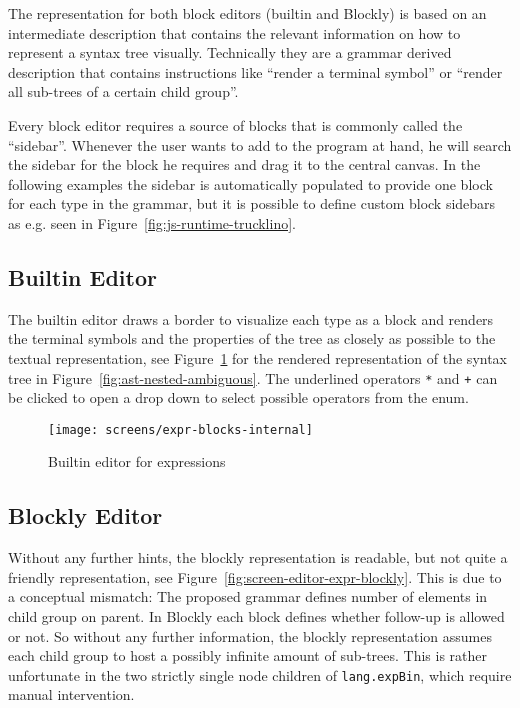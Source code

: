 \documentclass[sigconf,natbib=false]{acmart}
\newcommand{\enquote}[1]{``#1''}
\begin{document}
The representation for both block editors (builtin and Blockly) is based on an intermediate description that contains the relevant information on how to represent a syntax tree visually. Technically they are a grammar derived description that contains instructions like \enquote{render a terminal symbol} or \enquote{render all sub-trees of a certain child group}.

Every block editor requires a source of blocks that is commonly called the \enquote{sidebar}. Whenever the user wants to add to the program at hand, he will search the sidebar for the block he requires and drag it to the central canvas. In the following examples the sidebar is automatically populated to provide one block for each type in the grammar, but it is possible to define custom block sidebars as e.g. seen in Figure~\ref{fig:js-runtime-trucklino}.

\subsection{Builtin Editor}

The builtin editor draws a border to visualize each type as a block and renders the terminal symbols and the properties of the tree as closely as possible to the textual representation, see Figure~\ref{fig:screen-editor-expr-internal} for the rendered representation of the syntax tree in Figure~\ref{fig:ast-nested-ambiguous}. The underlined operators \texttt{*} and \texttt{+} can be clicked to open a drop down to select possible operators from the enum.

\begin{figure}[H]
  \texttt{[image: screens/expr-blocks-internal]}
  \caption{Builtin editor for expressions}
  \label{fig:screen-editor-expr-internal}
\end{figure}

\subsection{Blockly Editor}

Without any further hints, the blockly representation is readable, but not quite a friendly representation, see Figure~\ref{fig:screen-editor-expr-blockly}. This is due to a conceptual mismatch: The proposed grammar defines number of elements in child group on parent. In Blockly each block defines whether follow-up is allowed or not. So without any further information, the blockly representation assumes each child group to host a possibly infinite amount of sub-trees. This is rather unfortunate in the two strictly single node children of \texttt{lang.expBin}, which require manual intervention.
\end{document}
